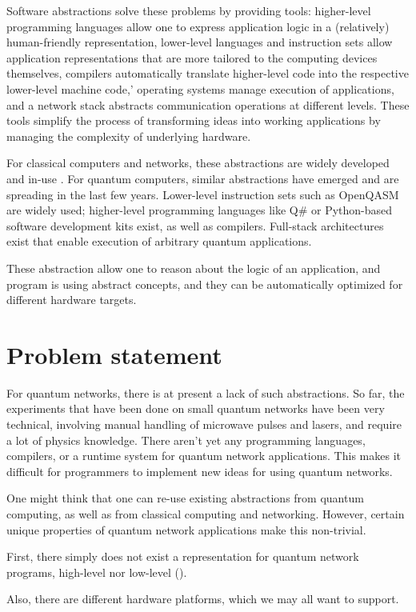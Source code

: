 Software abstractions solve these problems by providing tools:
higher-level programming languages allow one to express application logic in a (relatively) human-friendly representation,
lower-level languages and instruction sets allow application representations that are more tailored to the computing devices themselves,
compilers automatically translate higher-level code into the respective lower-level machine code,'
operating systems manage execution of applications,
and a network stack abstracts communication operations at different levels.
These tools simplify the process of transforming ideas into working applications by managing the complexity of underlying hardware.

For classical computers and networks, these abstractions are widely developed and in-use .
For quantum computers, similar abstractions have emerged and are spreading in the last few years.
Lower-level instruction sets such as OpenQASM are widely used;
higher-level programming languages like Q\# or Python-based software development kits exist, as well as compilers.
Full-stack architectures exist that enable execution of arbitrary quantum applications.

These abstraction allow one to reason about the logic of an application, and program is using abstract concepts, and they can be automatically optimized for different hardware targets.


\section{Problem statement}
For quantum networks, there is at present a lack of such abstractions.
So far, the experiments that have been done on small quantum networks have been very technical, involving manual handling of microwave pulses and lasers, and require a lot of physics knowledge.
There aren't yet any programming languages, compilers, or a runtime system for quantum network applications.
This makes it difficult for programmers to implement new ideas for using quantum networks.

One might think that one can re-use existing abstractions from quantum computing, as well as from classical computing and networking.
However, certain unique properties of quantum network applications make this non-trivial.

First, there simply does not exist a representation for quantum network programs, high-level nor low-level ().

Also, there are different hardware platforms, which we may all want to support.

